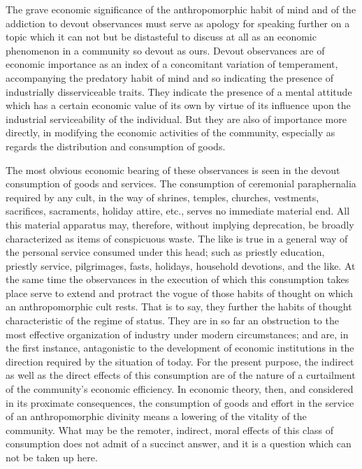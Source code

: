 \documentclass[12pt]{report}
\begin{document}
The grave economic significance of the anthropomorphic habit of mind
and of the addiction to devout observances must serve as apology for
speaking further on a topic which it can not but be distasteful to
discuss at all as an economic phenomenon in a community so devout as
ours. Devout observances are of economic importance as an index of a
concomitant variation of temperament, accompanying the predatory habit
of mind and so indicating the presence of industrially disserviceable
traits. They indicate the presence of a mental attitude which has a
certain economic value of its own by virtue of its influence upon
the industrial serviceability of the individual. But they are also of
importance more directly, in modifying the economic activities of the
community, especially as regards the distribution and consumption of
goods.

The most obvious economic bearing of these observances is seen in the
devout consumption of goods and services. The consumption of ceremonial
paraphernalia required by any cult, in the way of shrines, temples,
churches, vestments, sacrifices, sacraments, holiday attire, etc.,
serves no immediate material end. All this material apparatus may,
therefore, without implying deprecation, be broadly characterized as
items of conspicuous waste. The like is true in a general way of the
personal service consumed under this head; such as priestly education,
priestly service, pilgrimages, fasts, holidays, household devotions,
and the like. At the same time the observances in the execution of which
this consumption takes place serve to extend and protract the vogue of
those habits of thought on which an anthropomorphic cult rests. That is
to say, they further the habits of thought characteristic of the regime
of status. They are in so far an obstruction to the most effective
organization of industry under modern circumstances; and are, in the
first instance, antagonistic to the development of economic institutions
in the direction required by the situation of today. For the present
purpose, the indirect as well as the direct effects of this consumption
are of the nature of a curtailment of the community's economic
efficiency. In economic theory, then, and considered in its proximate
consequences, the consumption of goods and effort in the service of
an anthropomorphic divinity means a lowering of the vitality of the
community. What may be the remoter, indirect, moral effects of this
class of consumption does not admit of a succinct answer, and it is a
question which can not be taken up here.
\end{document}
